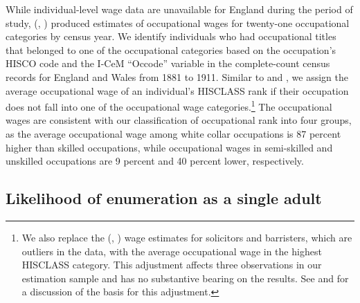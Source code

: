 \documentclass[12pt,english]{article}
\begin{document}
While individual-level wage data are unavailable for England during the period of study, \citeauthor{Williamson1980} (\citeyear{Williamson1980}, \citeyear{Williamson1982}) produced estimates of occupational wages for twenty-one occupational categories by census year. We identify individuals who had occupational titles that belonged to one of the occupational categories based on the occupation's HISCO code and the I-CeM ``Occode'' variable in the complete-count census records for England and Wales from 1881 to 1911. Similar to \citet{Long2006} and \citet{Long2013}, we assign the average occupational wage of an individual's HISCLASS rank if their occupation does not fall into one of the occupational wage categories.\footnote{We also replace the \citeauthor{Williamson1980} (\citeyear{Williamson1980}, \citeyear{Williamson1982}) wage estimates for solicitors and barristers, which are outliers in the data, with the average occupational wage in the highest HISCLASS category. This adjustment affects three observations in our estimation sample and has no substantive bearing on the results. See \citet{Long2006} and \citet{Long2013} for a discussion of the basis for this adjustment.} The occupational wages are consistent with our classification of occupational rank into four groups, as the average occupational wage among white collar occupations is 87 percent higher than skilled occupations, while occupational wages in semi-skilled and unskilled occupations are 9 percent and 40 percent lower, respectively.

\subsection{Likelihood of enumeration as a single adult \label{subsec:marriage}}
\end{document}
